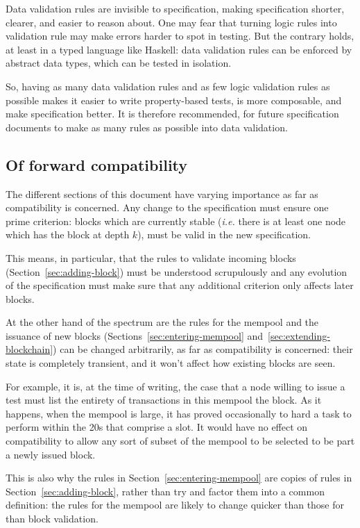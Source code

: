 \documentclass{article}
\begin{document}
Data validation rules are invisible to specification, making
specification shorter, clearer, and easier to reason about. One may
fear that turning logic rules into validation rule may make errors
harder to spot in testing. But the contrary holds, at least in a typed
language like Haskell: data validation rules can be enforced by abstract
data types, which can be tested in isolation.

So, having as many data validation rules and as few logic validation
rules as possible makes it easier to write property-based tests, is
more composable, and make specification better. It is therefore
recommended, for future specification documents to make as many rules
as possible into data validation.

\subsection{Of forward compatibility}
\label{sec:forward-comp}

The different sections of this document have varying importance as far
as compatibility is concerned. Any change to the specification must
ensure one prime criterion: blocks which are currently stable
(\emph{i.e.} there is at least one node which has the block at depth
$k$), must be valid in the new specification.

This means, in particular, that the rules to validate incoming blocks
(Section~\ref{sec:adding-block}) must be understood scrupulously and
any evolution of the specification must make sure that any additional
criterion only affects later blocks.

At the other hand of the spectrum are the rules for the mempool and
the issuance of new blocks (Sections~\ref{sec:entering-mempool}
and~\ref{sec:extending-blockchain}) can be changed arbitrarily, as far
as compatibility is concerned: their state is completely transient,
and it won't affect how existing blocks are seen.

For example, it is, at the time of writing, the case that a node
willing to issue a test must list the entirety of transactions in this
mempool the block. As it happens, when the mempool is large, it has
proved occasionally to hard a task to perform within the 20s that
comprise a slot. It would have no effect on compatibility to allow any
sort of subset of the mempool to be selected to be part a newly issued
block.

This is also why the rules in Section~\ref{sec:entering-mempool} are
copies of rules in Section~\ref{sec:adding-block}, rather than try and
factor them into a common definition: the rules for the mempool are
likely to change quicker than those for than block validation.
\end{document}
